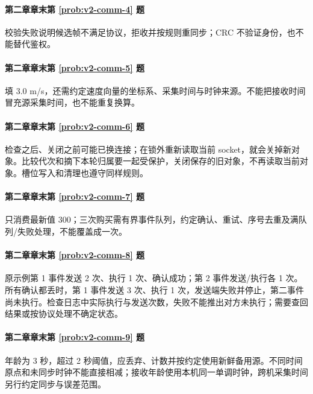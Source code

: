 \paragraph*{第二章章末第 \ref{prob:v2-comm-4} 题}
\begin{solution}
校验失败说明候选帧不满足协议，拒收并按规则重同步；CRC 不验证身份，也不能替代鉴权。
\end{solution}
\paragraph*{第二章章末第 \ref{prob:v2-comm-5} 题}
\begin{solution}
填 3.0 m/s，还需约定速度向量的坐标系、采集时间与时钟来源。不能把接收时间冒充源采集时间，也不能重复换算。
\end{solution}
\paragraph*{第二章章末第 \ref{prob:v2-comm-6} 题}
\begin{solution}
检查之后、关闭之前可能已换连接；在锁外重新读取当前 socket，就会关掉新对象。比较代次和摘下本轮归属要一起受保护，关闭保存的旧对象，不再读取当前对象。槽位写入和清理也遵守同样规则。
\end{solution}
\paragraph*{第二章章末第 \ref{prob:v2-comm-7} 题}
\begin{solution}
只消费最新值 300；三次购买需有界事件队列，约定确认、重试、序号去重及满队列/失败处理，不能覆盖成一次。
\end{solution}
\paragraph*{第二章章末第 \ref{prob:v2-comm-8} 题}
\begin{solution}
原示例第 1 事件发送 2 次、执行 1 次、确认成功；第 2 事件发送/执行各 1 次。所有确认都丢时，第 1 事件发送 3 次、执行 1 次，发送端失败并停止，第二事件尚未执行。检查日志中实际执行与发送次数，失败不能推出对方未执行；需要查回结果或按协议处理不确定状态。
\end{solution}
\paragraph*{第二章章末第 \ref{prob:v2-comm-9} 题}
\begin{solution}
年龄为 3 秒，超过 2 秒阈值，应丢弃、计数并按约定使用新鲜备用源。不同时间原点和未同步时钟不能直接相减；接收年龄使用本机同一单调时钟，跨机采集时间另行约定同步与误差范围。
\end{solution}


